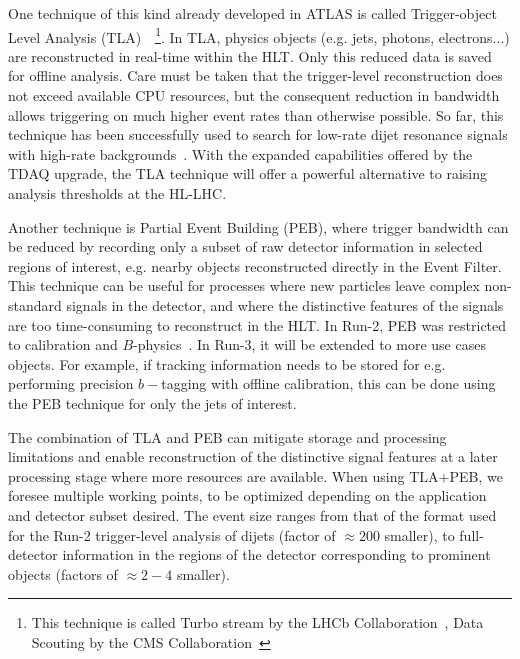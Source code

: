 One technique of this kind already developed in ATLAS is called Trigger-object Level Analysis (TLA)~\cite{EXOT-2016-20}~\footnote{This technique is called Turbo stream by the LHCb Collaboration~\cite{Aaij:2016rxn}, Data Scouting by the CMS Collaboration~\cite{Khachatryan:2016ecr}}. In TLA, physics objects (e.g. jets, photons, electrons...) are reconstructed in real-time within the HLT. Only this reduced data is saved for offline analysis. 
Care must be taken that the trigger-level reconstruction does not exceed available CPU resources, but the consequent reduction in bandwidth allows triggering on much higher event rates than otherwise possible. So far, this technique has been successfully used to search for low-rate dijet resonance signals with high-rate backgrounds~\cite{TLAPRL}. With the expanded capabilities offered by the TDAQ upgrade, the TLA technique will offer a powerful alternative to raising analysis thresholds at the HL-LHC.

Another technique is Partial Event Building (PEB), where trigger bandwidth can be reduced by recording only a subset of raw detector information in selected regions of interest, e.g. nearby objects reconstructed directly in the Event Filter.
This technique can be useful for processes where new particles leave complex non-standard signals in the detector, and where the distinctive features of the signals are too time-consuming to reconstruct in the HLT. In Run-2, PEB was restricted to calibration and $B$-physics~\cite{TRIG-2016-01}.
In Run-3, it will be extended to more use cases objects. %
For example, if tracking information needs to be stored for e.g. performing precision $b-$tagging with offline calibration, this can be done using the PEB technique for only the jets of interest.

The combination of TLA and PEB can mitigate storage and processing limitations and enable reconstruction of the distinctive signal features at a later processing stage where more resources are available.
When using TLA+PEB, we foresee multiple working points, to be optimized depending on the application and detector subset desired. The event size ranges from that of the format used for the Run-2 trigger-level analysis of dijets (factor of $\approx200$ smaller), to full-detector information in the regions of the detector corresponding to prominent objects (factors of $\approx 2-4$ smaller). %

